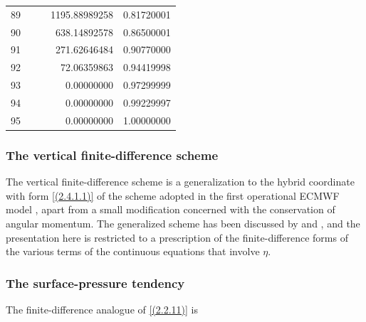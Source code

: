 \begin{center}
\begin{xtabular}{|r||rr||rr|}
89 &               &              &     1195.88989258 & 0.81720001 \\
90 &               &              &      638.14892578 & 0.86500001 \\
91 &               &              &      271.62646484 & 0.90770000 \\
92 &               &              &       72.06359863 & 0.94419998 \\
93 &               &              &        0.00000000 & 0.97299999 \\
94 &               &              &        0.00000000 & 0.99229997 \\
95 &               &              &        0.00000000 & 1.00000000 \\ 
\end{xtabular}
\end{center}
\newpage


























\subsubsection{The vertical finite-difference scheme} 

The vertical finite-difference scheme is a generalization to the
hybrid coordinate with form \ref{(2.4.1.1)} of the scheme adopted in
the first operational ECMWF model \cite[]{burridge77}, apart from a
small modification concerned with the conservation of angular
momentum. The generalized scheme has been discussed by
\cite{simmons81a} and \cite{simmons81b}, and the presentation here is
restricted to a prescription of the finite-difference forms of the
various terms of the continuous equations that involve $\eta$.

\subsubsection{The surface-pressure tendency}

The finite-difference analogue of \ref{(2.2.11)} is

